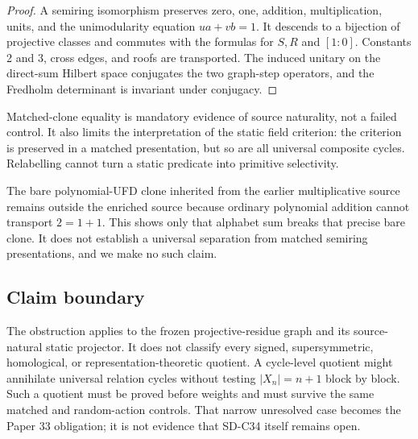 \begin{proof}
A semiring isomorphism preserves zero, one, addition, multiplication, units,
and the unimodularity equation $ua+vb=1$.  It descends to a bijection of
projective classes and commutes with the formulas for $S,R$ and $[1:0]$.
Constants 2 and 3, cross edges, and roofs are transported.  The induced
unitary on the direct-sum Hilbert space conjugates the two graph-step
operators, and the Fredholm determinant is invariant under conjugacy.
\end{proof}

Matched-clone equality is mandatory evidence of source naturality, not a
failed control.  It also limits the interpretation of the static field
criterion: the criterion is preserved in a matched presentation, but so are
all universal composite cycles.  Relabelling cannot turn a static predicate
into primitive selectivity.

The bare polynomial-UFD clone inherited from the earlier multiplicative
source remains outside the enriched source because ordinary polynomial
addition cannot transport $2=1+1$.  This shows only that alphabet sum breaks
that precise bare clone.  It does not establish a universal separation from
matched semiring presentations, and we make no such claim.

\subsection{Claim boundary}

The obstruction applies to the frozen projective-residue graph and its
source-natural static projector.  It does not classify every signed,
supersymmetric, homological, or representation-theoretic quotient.  A
cycle-level quotient might annihilate universal relation cycles without
testing $|X_n|=n+1$ block by block.  Such a quotient must be proved before
weights and must survive the same matched and random-action controls.  That
narrow unresolved case becomes the Paper 33 obligation; it is not evidence
that SD-C34 itself remains open.
